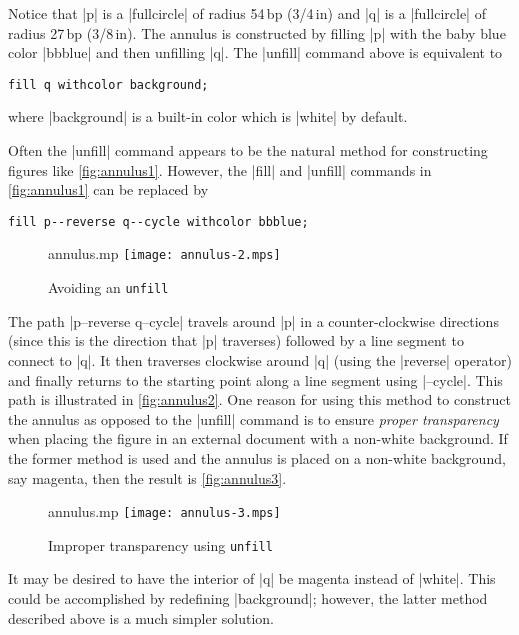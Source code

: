 Notice that |p| is a |fullcircle| of radius 54\,bp (3/4\,in) and |q| is
a |fullcircle| of radius 27\,bp (3/8\,in).  The annulus is constructed
by filling |p| with the baby blue color |bbblue| and then unfilling |q|.
The |unfill| command above is equivalent to

\begin{lstlisting}[style=MP]
fill q withcolor background;
\end{lstlisting}
where |background| is a built-in color which is |white| by default.

Often the |unfill| command appears to be the natural method for
constructing figures like \autoref{fig:annulus1}.  However, the |fill|
and |unfill| commands in \autoref{fig:annulus1} can be replaced by

\begin{lstlisting}[style=MP]
fill p--reverse q--cycle withcolor bbblue;
\end{lstlisting}

\begin{figure}
  \begin{withattachment}{annulus.mp}
    \centering
    \texttt{[image: annulus-2.mps]}
  \end{withattachment}
  \caption{Avoiding an \texttt{unfill}}
  \label{fig:annulus2}
\end{figure}

The path |p--reverse q--cycle| travels around |p| in a counter-clockwise
directions (since this is the direction that |p| traverses) followed by
a line segment to connect to |q|.  It then traverses clockwise around
|q| (using the |reverse| operator) and finally returns to the starting
point along a line segment using |--cycle|.  This path is illustrated in
\autoref{fig:annulus2}.  One reason for using this method to construct
the annulus as opposed to the |unfill| command is to ensure
\textit{proper transparency} when placing the figure in an external
document with a non-white background.  If the former method is used and
the annulus is placed on a non-white background, say magenta, then the
result is \autoref{fig:annulus3}.

\begin{figure}
  \begin{withattachment}{annulus.mp}
    \centering
    \texttt{[image: annulus-3.mps]}
  \end{withattachment}
  \caption{Improper transparency using \texttt{unfill}}
  \label{fig:annulus3}
\end{figure}

It may be desired to have the interior of |q| be magenta instead of
|white|.  This could be accomplished by redefining |background|;
however, the latter method described above is a much simpler solution.
